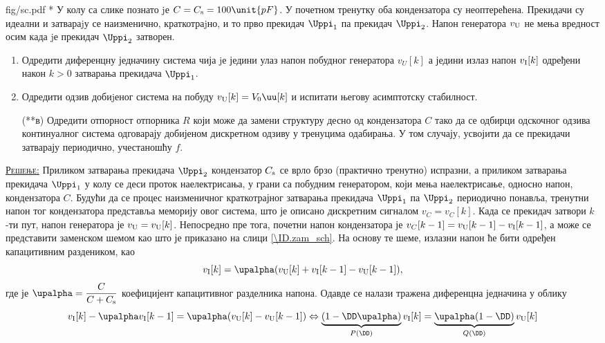 \begin{slikaDesno}{fig/sc.pdf}
    {\color{red}*}\PID
    У колу са слике познато jе $C = C_{\rm s} = 100\unit{pF}$. 
    У почетном тренутку оба кондензатора су неоптерећена.
Прекидачи су идеални и затвараjу се наизменично,
краткотраjно, и то прво прекидач $\Uppi_1$ па прекидач
$\Uppi_2$. Напон генератора $v_{\rm U}$ не мења вредност осим када
jе прекидач $\Uppi_2$ затворен.
\end{slikaDesno}
\begin{enumerate}[label=(\alph*)]
    \item Одредити диференцну једначину система чија jе
    једини улаз напон побудног генератора $v_U[k]$ а једини излаз напон 
    $v_{\rm I}[k]$ одређени након $k > 0$ затварања прекидача $\Uppi_1$.
    \item Одредити одзив добиjеног система на побуду $v_{\rm U}[k] = V_0 \uu[k]$ и 
    испитати његову асимптотску стабилност.
    \item[({\color{red}**}в)] Одредити отпорност отпорника $R$ који може да замени 
    структуру десно од кондензатора $C$ тако да се одбирци одскочног 
    одзива континуалног система одговарају добијеном дискретном одзиву у тренуцима 
    одабирања. У том случају, усвојити да се прекидачи затварају периодично, 
    учестаношћу $f$.
\end{enumerate}
\vspace*{2mm}

\textsc{\underline{Решење:}} Приликом затварања прекидача $\Uppi_2$ кондензатор $C_{\rm s}$ се врло брзо (практично тренутно) испразни, а 
приликом затварања прекидача $\Uppi_1$ у колу се деси проток наелектрисања, у грани са побудним генератором, који мења наелектрисање, односно напон, 
кондензатора $C$. Будући да се процес
наизменичног краткотрајног затварања прекидача $\Uppi_1$ па $\Uppi_2$ периодично понавља, тренутни напон тог кондензатора представља 
меморију овог система, што је описано дискретним сигналом $v_C = {v_C}[k]$. Када се прекидач затвори $k$-ти пут, напон генератора је 
$v_{\rm U} = v_{\rm U}[k]$. Непосредно пре тога, почетни напон кондензатора је $v_{C}[k-1] = v_{\rm U}[k-1] - v_{\rm I}[k-1]$, а
може се представити заменском шемом као што је приказано на слици \ref{\ID.zam_sch}. На основу те шеме, излазни напон ће бити 
одређен капацитивним раздеником, као
\begin{equation}
    v_{\rm I}[k] = \upalpha (v_{\rm U}[k] + v_{\rm I}[k-1] - v_{\rm U}[k-1] ),
\end{equation}
где је $\upalpha =  \dfrac{C}{C + C_{\rm s}}$ коефицијент капацитивног разделника напона.
Одавде се налази тражена диференцна једначина у облику 
\begin{equation}
    v_{\rm I}[k] - \upalpha v_{\rm I}[k-1] = \upalpha( v_{\rm U}[k] - v_{\rm U}[k-1] ) 
    \Leftrightarrow
    \underbrace{( 1 - \DD \upalpha )}_{P(\DD)} v_{\rm I}[k] = \underbrace{\upalpha(1 - \DD)}_{Q(\DD)} v_{\rm U}[k]
\end{equation}

